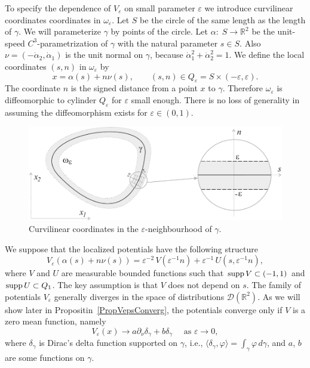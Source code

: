 \documentclass[graybox]{svmult}
\newcommand{\supp}{\mathop{\rm supp}}
\newcommand{\Real}{\mathbb R}
\newcommand{\eps}{\varepsilon}
\renewcommand{\phi}{\varphi}
\begin{document}
To specify  the dependence of $V_\eps$ on  small parameter $\eps$ we introduce  curvilinear coordinates coordinates in $\omega_\eps$.
Let $S$ be the circle of the same length as the length of $\gamma$.
We will parameterize $\gamma$ by points of the circle.
Let $\alpha\colon\; S\to \Real^2$ be the unit-speed $C^3$-parametrization of $\gamma$ with the natural parameter $s\in S$.
Also  $\nu=(-\dot{\alpha}_2, \dot{\alpha}_1)$ is the unit normal on $\gamma$, because  $\dot{\alpha}_1^2+\dot{\alpha}_2^2=1$.
We define the local coordinates $(s,n)$ in $\omega_\eps$ by
\begin{equation}\label{LocalTr}
    x=\alpha(s)+n\nu(s), \qquad (s,n)\in Q_\eps=S\times (-\eps, \eps).
\end{equation}
The coordinate $n$ is the signed distance from a point $x$ to $\gamma$.
Therefore  $\omega_\eps$ is diffeomorphic to cylinder $Q_\eps$ for $\eps$ small enough. There is no loss of generality in assuming the diffeomorphism exists for $\eps\in (0,1)$.

\begin{figure}[b]
\centering
\includegraphics[scale=.6]{LocalCoords}
\caption{Curvilinear coordinates in the $\eps$-neighbourhood of $\gamma$.}
\label{FigLocalCoords}
\end{figure}


We suppose that the localized potentials have the following structure
\begin{equation}\label{Veps}
V_\eps(\alpha(s)+n\nu(s))=\eps^{-2}\,V\left(\eps^{-1}n\right)
+\eps^{-1}\,U\left(s,\eps^{-1}n\right),
\end{equation}
where $V$ and $U$ are measurable bounded functions such that $\supp V\subset (-1,1)$ and $\supp U\subset Q_1$. The key assumption is that $V$ does not depend on  $s$.
The family of potentials $V_\eps$ generally diverges in the space of distributions $\mathcal{D}(\Real^2)$.
As we will show later in Propositin~\ref{PropVepsConverg},
the  potentials converge only if $V$ is a zero mean function, namely
$$
   V_\eps(x)\to a \partial_\nu\delta_\gamma+b\delta_\gamma\quad \mbox{ as \ }\eps\to 0,
$$
where $\delta_\gamma$ is Dirac's delta function supported on $\gamma$, i.e., $\langle\delta_\gamma, \phi\rangle=\int_\gamma \phi \,d \gamma$,  and $a$, $b$ are some functions on $\gamma$.
\end{document}
